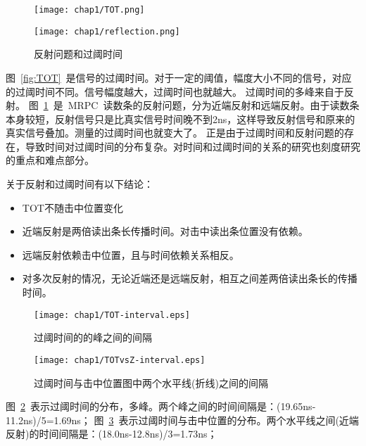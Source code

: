 \begin{figure}[!h]
\begin{minipage}[!h]{0.5\linewidth}
\texttt{[image: chap1/TOT.png]}
\label{fig:TOT}
\end{minipage}
\hfill
\begin{minipage}[!h]{0.5\linewidth}
\texttt{[image: chap1/reflection.png]}
\label{fig:reflection}
\end{minipage}%
\caption{反射问题和过阈时间}
\end{figure}


图~\ref{fig:TOT}~是信号的过阈时间。对于一定的阈值，幅度大小不同的信号，对应的过阈时间不同。信号幅度越大，过阈时间也就越大。
过阈时间的多峰来自于反射。
图~\ref{fig:reflection}~是~MRPC~读数条的反射问题，分为近端反射和远端反射。由于读数条本身较短，反射信号只是比真实信号时间晚不到2ns，这样导致反射信号和原来的真实信号叠加。测量的过阈时间也就变大了。
正是由于过阈时间和反射问题的存在，导致时间对过阈时间的分布复杂。对时间和过阈时间的关系的研究也刻度研究的重点和难点部分。

关于反射和过阈时间有以下结论：
\begin{itemize}
\item{TOT不随击中位置变化}
\item{近端反射是两倍读出条长传播时间。对击中读出条位置没有依赖。}
\item{远端反射依赖击中位置，且与时间依赖关系相反。}
\item{对多次反射的情况，无论近端还是远端反射，相互之间差两倍读出条长的传播时间。}
\end{itemize}

\begin{figure}[!h]
  \centering
  \texttt{[image: chap1/TOT-interval.eps]}
  \caption{过阈时间的的峰之间的间隔}
  \label{fig:TOT-interval}
\end{figure}

\begin{figure}[!h]
  \centering
  \texttt{[image: chap1/TOTvsZ-interval.eps]}
  \caption{过阈时间与击中位置图中两个水平线(折线)之间的间隔}
  \label{fig:TOTvsZ-interval}
\end{figure}
图~\ref{fig:TOT-interval}~表示过阈时间的分布，多峰。两个峰之间的时间间隔是：(19.65ns-11.2ns)/5=1.69ns；
图~\ref{fig:TOTvsZ-interval}~表示过阈时间与击中位置的分布。两个水平线之间(近端反射)的时间间隔是：(18.0ns-12.8ns)/3=1.73ns；

